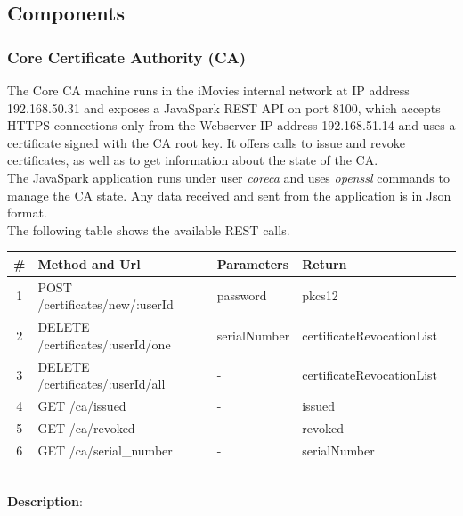 \documentclass[english]{article}
\begin{document}
\subsection{Components}

\subsubsection{Core Certificate Authority (CA)}
The Core CA machine runs in the iMovies internal network at IP address 192.168.50.31 and exposes a JavaSpark REST API on port 8100, which accepts HTTPS connections only from the Webserver IP address 192.168.51.14 and uses a certificate signed with the CA root key. It offers calls to issue and revoke certificates, as well as to get information about the state of the CA.\\
The JavaSpark application runs under user \emph{coreca} and uses \emph{openssl} commands to manage the CA state. Any data received and sent from the application is in Json format.\\
The following table shows the available REST calls.
\\
\begin{tabular} {| c | l | l | l | l |}
\hline
\textbf{\#} & \textbf{Method and Url} & \textbf{Parameters} & \textbf{Return}\\
\hline
1 & POST /certificates/new/:userId & password & pkcs12\\
\hline
2 & DELETE /certificates/:userId/one & serialNumber & certificateRevocationList\\
\hline
3 & DELETE /certificates/:userId/all & - & certificateRevocationList\\
\hline
4 & GET /ca/issued & - & issued\\
\hline
5 & GET /ca/revoked & - & revoked\\
\hline
6 & GET /ca/serial\_number & - & serialNumber\\
\hline
\end{tabular}
\\
\textbf{Description}:
\end{document}
